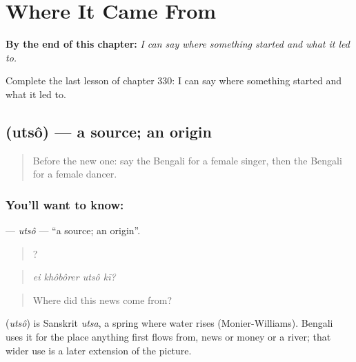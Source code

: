 
\chapter{Where It Came From}
\label{ch:bn-where-it-came-from}

\begin{chapteropening}
\textbf{By the end of this chapter:} \emph{I can say where something started and what it led to.}

Complete the last lesson of chapter 330: I can say where something started and what it led to.
\end{chapteropening}

\section[\texorpdfstring{\bn{উৎস} (utsô)}{উৎস (utsô)}]{ (utsô) — a source; an origin}

\label{lesson:BN-C330-utso}



\begin{quote}
Before the new one: say the Bengali for a female singer, then the Bengali for a female dancer.
\end{quote}

\subsection*{You'll want to know: }
\textbf{} — \emph{utsô} — \textquotedblleft{}a source; an origin\textquotedblright{}.

\begin{quote}
   ?
\end{quote}

\begin{quote}
\emph{ei khôbôrer utsô kī?}
\end{quote}

\begin{quote}
Where did this news come from?
\end{quote}

\begin{cousinweb}
\textbf{} (\emph{utsô}) is Sanskrit \emph{utsa}, a spring where water rises (Monier-Williams). Bengali uses it for the place anything first flows from, news or money or a river; that wider use is a later extension of the picture.
\end{cousinweb}

